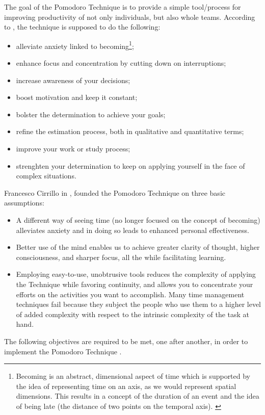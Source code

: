 \documentclass[11pt,singleside]{myfithesis2}
\begin{document}
The goal of the Pomodoro Technique is to provide a simple tool/process for improving productivity of not only individuals, but also whole teams. According to \cite{pomodoro}, the technique is supposed to do the following:
\begin{itemize}
	\item alleviate anxiety linked to becoming\footnote{Becoming is an abstract, dimensional aspect of time which is supported by the idea of representing time on an axis,  as we would represent spatial dimensions. This results in a concept of the duration of an event and the idea of being late (the distance of two points on the temporal axis). \cite{pomodoro}};
	\item enhance focus and concentration by cutting down on interruptions;
	\item increase awareness of your decisions;
	\item boost motivation and keep it constant;
	\item bolster the determination to achieve your goals;
	\item refine the estimation process, both in qualitative and quantitative terms;
	\item improve your work or study process;
	\item strenghten your determination to keep on applying yourself in the face of complex situations.
\end{itemize}

Francesco Cirrillo in \cite{pomodoro}, founded the Pomodoro Technique on three basic assumptions:
\begin{itemize}
	\item A different way of seeing time (no longer focused on the concept of becoming) alleviates anxiety and in doing so leads to enhanced personal effectiveness. 
	\item Better use of the mind enables us to achieve greater clarity of thought, higher consciousness, and sharper focus, all the while facilitating learning. 
	\item Employing easy-to-use, unobtrusive tools reduces the complexity of applying the Technique while favoring continuity, and allows you to concentrate your efforts on the 	activities you want to accomplish. Many time management techniques fail because they subject the people who use them to a higher level of added complexity with respect to the intrinsic complexity of the task at hand.
\end{itemize}

The following objectives are required to be met, one after another, in order to implement the Pomodoro Technique \cite{pomodoro}.
\end{document}
